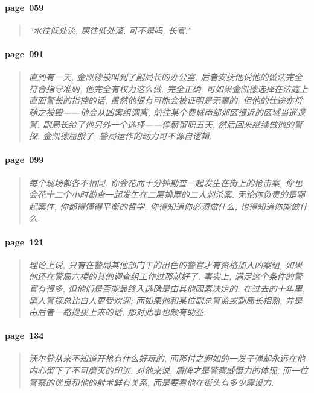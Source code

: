 \paragraph*{page~059}
\begin{quotation}
    \itshape
    ``水往低处流, 屎往低处滚. 可不是吗, 长官.'' 
\end{quotation}

\paragraph*{page~091}
\begin{quotation}
    \itshape
    直到有一天, 金凯德被叫到了副局长的办公室, 后者安抚他说他的做法完全符合指导准则, 他完全有权力这么做. 完全正确. 可如果金凯德选择在法庭上直面警长的指控的话, 虽然他很有可能会被证明是无辜的, 但他的仕途亦将随之被毁------他会从凶案组调离, 前往某个费城南部郊区很近的区域当巡逻警. 副局长给了他另外一个选择------停薪留职五天, 然后回来继续做他的警探. 金凯德屈服了, 警局运作的动力可不源自逻辑. 
\end{quotation}

\paragraph*{page~099}
\begin{quotation}
    \itshape
    每个现场都各不相同. 你会花而十分钟勘查一起发生在街上的枪击案, 你也会花十二个小时勘查一起发生在二层排屋的二人刺杀案. 无论你负责的是哪起案件, 你都得懂得平衡的哲学, 你得知道你必须做什么, 也得知道你能做什么. 
\end{quotation}

\paragraph*{page~121}
\begin{quotation}
    \itshape
    理论上说, 只有在警局其他部门干的出色的警官才有资格加入凶案组, 如果他还在警局六楼的其他调查组工作过那就好了. 事实上, 满足这个条件的警官有很多, 但他们是否能最终入选确是由其他因素决定的. 在过去的十年里, 黑人警探总比白人更受欢迎; 而如果他和某位副总警监或副局长相熟, 并是由后者一路提拔上来的话, 那对此事也颇有助益. 
\end{quotation}

\paragraph*{page~134}
\begin{quotation}
    \itshape
    沃尔登从来不知道开枪有什么好玩的, 而那付之阙如的一发子弹却永远在他内心留下了不可磨灭的印迹. 对他来说, 盾牌才是警察威慑力的体现, 而一位警察的优良和他的射术鲜有关系, 而是要看他在街头有多少震设力. 
\end{quotation}

